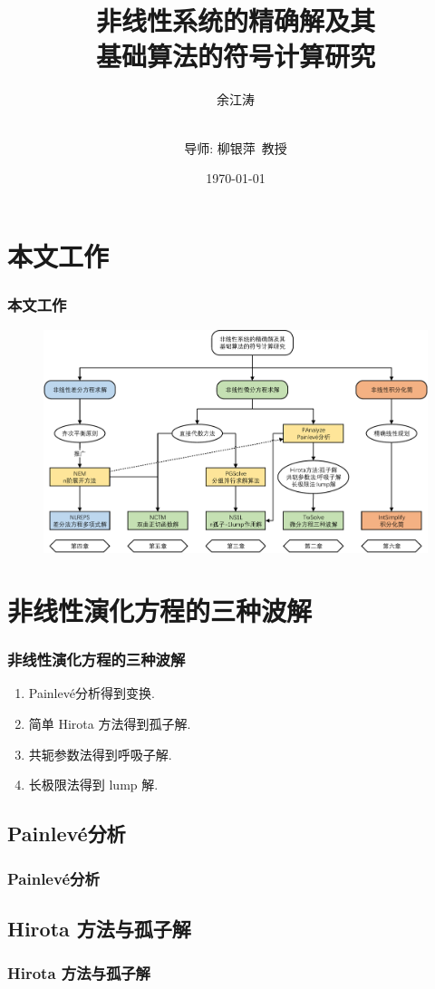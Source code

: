 \documentclass[serif]{beamer}
\title[华东师范大学硕士学位论文]{非线性系统的精确解及其\\ 基础算法的符号计算研究}
\author[余江涛]{余江涛 \and \\导师: 柳银萍~教授}
\date{\today}
\newcommand{\Painleve}{Painlev{\'e}}
\begin{document}
\frame{\titlepage}

\section{本文工作}
\begin{frame}
\frametitle{本文工作}
\begin{figure}
\centering
\includegraphics[width=\textwidth]{../paper/fig/outline.pdf} 
\end{figure}
\end{frame}

\section{非线性演化方程的三种波解}
\begin{frame}
\frametitle{非线性演化方程的三种波解}
\begin{enumerate}
\item \Painleve{}分析得到变换.
\item 简单 Hirota 方法得到孤子解.
\item 共轭参数法得到呼吸子解.
\item 长极限法得到 lump 解.
\end{enumerate}
\end{frame}

\subsection{\Painleve{}分析}
\begin{frame}
\frametitle{\Painleve{}分析}
\end{frame}

\subsection{Hirota 方法与孤子解}
\begin{frame}
\frametitle{Hirota 方法与孤子解}
\end{frame}
\end{document}
